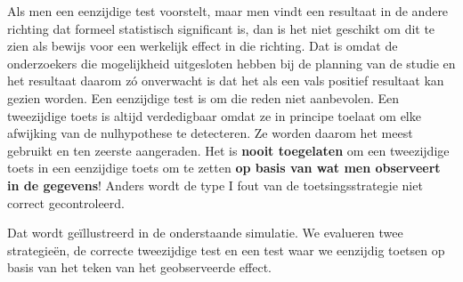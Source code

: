 \documentclass[12pt,dutch,coursenotes]{book}
\newenvironment{Shaded}{\begin{snugshade}}{\end{snugshade}}
\newcommand{\KeywordTok}[1]{\textcolor[rgb]{0.13,0.29,0.53}{\textbf{#1}}}
\newcommand{\DataTypeTok}[1]{\textcolor[rgb]{0.13,0.29,0.53}{#1}}
\newcommand{\DecValTok}[1]{\textcolor[rgb]{0.00,0.00,0.81}{#1}}
\newcommand{\FloatTok}[1]{\textcolor[rgb]{0.00,0.00,0.81}{#1}}
\newcommand{\StringTok}[1]{\textcolor[rgb]{0.31,0.60,0.02}{#1}}
\newcommand{\ControlFlowTok}[1]{\textcolor[rgb]{0.13,0.29,0.53}{\textbf{#1}}}
\newcommand{\OperatorTok}[1]{\textcolor[rgb]{0.81,0.36,0.00}{\textbf{#1}}}
\newcommand{\NormalTok}[1]{#1}
\theoremstyle{definition}
\theoremstyle{definition}
\theoremstyle{definition}
\theoremstyle{remark}
\begin{document}
Als men een eenzijdige test voorstelt, maar men vindt een resultaat in
de andere richting dat formeel statistisch significant is, dan is het
niet geschikt om dit te zien als bewijs voor een werkelijk effect in die
richting. Dat is omdat de onderzoekers die mogelijkheid uitgesloten
hebben bij de planning van de studie en het resultaat daarom zó
onverwacht is dat het als een vals positief resultaat kan gezien worden.
Een eenzijdige test is om die reden niet aanbevolen. Een tweezijdige
toets is altijd verdedigbaar omdat ze in principe toelaat om elke
afwijking van de nulhypothese te detecteren. Ze worden daarom het meest
gebruikt en ten zeerste aangeraden. Het is \textbf{nooit toegelaten} om
een tweezijdige toets in een eenzijdige toets om te zetten \textbf{op
basis van wat men observeert in de gegevens}! Anders wordt de type I
fout van de toetsingsstrategie niet correct gecontroleerd.

Dat wordt geïllustreerd in de onderstaande simulatie. We evalueren twee
strategieën, de correcte tweezijdige test en een test waar we eenzijdig
toetsen op basis van het teken van het geobserveerde effect.

\begin{Shaded}
\end{Shaded}
\end{document}
